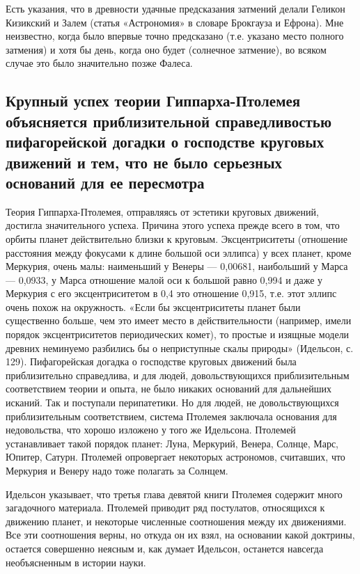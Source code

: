 Есть указания, что в древности удачные предсказания затмений делали
Геликон Кизикский и Залем (статья «Астрономия» в словаре Брокгауза и
Ефрона). Мне неизвестно, когда было впервые точно предсказано (т.е.
указано место полного затмения) и хотя бы день, когда оно будет
(солнечное затмение), во всяком случае это было значительно позже
Фалеса.

\subsection{Крупный успех теории Гиппарха-Птолемея объясняется
приблизительной справедливостью пифагорейской догадки о господстве
круговых движений и тем, что не было серьезных оснований для ее
пересмотра}

Теория Гиппарха-Птолемея, отправляясь от эстетики круговых
движений, достигла значительного успеха. Причина этого успеха прежде
всего в том, что орбиты планет действительно близки к круговым.
Эксцентриситеты (отношение расстояния между фокусами к длине большой
оси эллипса) у всех планет, кроме Меркурия, очень малы: наименьший у
Венеры --- 0,00681, наибольший у Марса --- 0,0933, у Марса отношение
малой оси к большой равно 0,994 и даже у Меркурия с его
эксцентриситетом в 0,4 это отношение 0,915, т.е. этот эллипс очень
похож на окружность. «Если бы эксцентриситеты планет были существенно
больше, чем это имеет место в действительности (например, имели
порядок эксцентриситетов периодических комет), то простые и изящные
модели древних неминуемо разбились бы о неприступные скалы природы»
(Идельсон, с. 129). Пифагорейская догадка о господстве круговых
движений была приблизительно справедлива, и для людей,
довольствующихся приблизительным соответствием теории и опыта, не было
никаких оснований для дальнейших исканий. Так и поступали
перипатетики. Но для людей, не довольствующихся приблизительным
соответствием, система Птолемея заключала основания для недовольства,
что хорошо изложено у того же Идельсона. Птолемей устанавливает такой
порядок планет: Луна, Меркурий, Венера, Солнце, Марс, Юпитер, Сатурн.
Птолемей опровергает некоторых астрономов, считавших, что Меркурия и
Венеру надо тоже полагать за Солнцем.

Идельсон указывает, что третья глава девятой книги Птолемея содержит
много загадочного материала. Птолемей приводит ряд постулатов,
относящихся к движению планет, и некоторые численные соотношения между
их движениями. Все эти соотношения верны, но откуда он их взял, на
основании какой доктрины, остается совершенно неясным и, как думает
Идельсон, останется навсегда необъясненным в истории науки.

